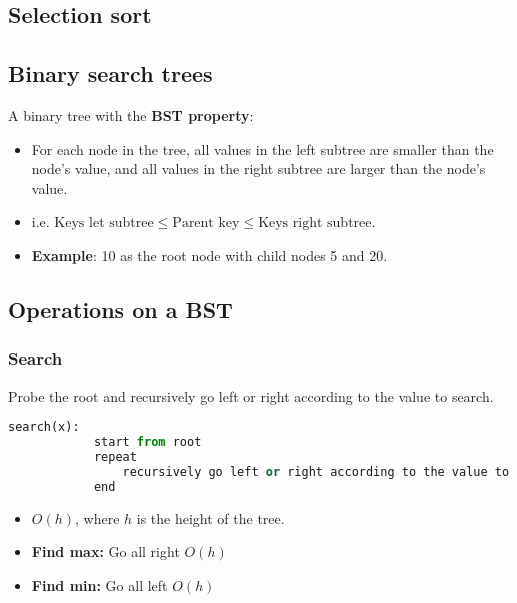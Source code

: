 \subsection{Selection sort}

\subsection{Binary search trees}
\begin{definition}
    A binary tree with the \textbf{BST property}: 
    \begin{itemize}
        \item For each node in the tree, all values in the left subtree are smaller than the node's value, and all values in the right subtree are larger than the node's value.
        \item i.e. $\text{Keys let subtree} \leq \text{Parent key} \leq \text{Keys right subtree}$.
    \end{itemize}
    \begin{itemize}
        \item \textbf{Example}: 10 as the root node with child nodes 5 and 20.
    \end{itemize}
\end{definition}

\subsection{Operations on a BST}

\subsubsection{Search}
\begin{definition}
    Probe the root and recursively go left or right according to the value to search.

    \begin{lstlisting}[language=Python, caption={Search Operation}]
        search(x):
            start from root
            repeat 
                recursively go left or right according to the value to search
            end
    \end{lstlisting}
    \begin{itemize}
        \item \( O(h) \), where \( h \) is the height of the tree.
        \item \textbf{Find max:} Go all right $O(h)$
        \item \textbf{Find min:} Go all left $O(h)$
    \end{itemize}
\end{definition}

